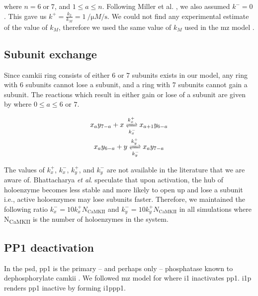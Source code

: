 \documentclass[9pt,lineno,doublespacing]{elife}
\newcommand\SUB[2]{#1\textsubscript{#2}}
\begin{document}
{\noindent where $n=6\;\text{or}\;7$, and $1\le a \le n$. Following Miller et al.
\citep{miller_stability_2005}, we also assumed $k^-=0$. This gave us
$k^+=\frac{k_2}{k_M}=\SI{1}{\per\micro M\per\second}$. We could not find any
experimental estimate of the value of $k_M$, therefore we used the same value of $k_M$ 
used in the \gls{mz} model \citep{miller_stability_2005}.

\subsection{Subunit exchange}\label{subunit exchange} Since \gls{camkii} ring
consists of either 6 or 7 subunits exists in our model, any ring with 6 subunits
cannot lose a subunit, and a ring with 7 subunits cannot gain a subunit. The
reactions which result in either gain or lose of a subunit are given by
 where $0\le a \le 6\text{ or }7$.

\begin{equation}\label{eq:losegainx}
    \begin{gathered}
    x_ay_{7-a} + x \xrightleftharpoons[k^-_x]{k^+_x} x_{a+1}y_{6-a} \\
    x_ay_{6-a} + y \xrightleftharpoons[k^-_y]{k^+_y} x_{a}y_{7-a}
    \end{gathered}
\end{equation}

The values of $k_x^+$, $k_x^-$, $k_y^+$, and $k_y^-$ are not available
in the literature that we are aware of. Bhattacharya \textit{et al}.
\citep{bhattacharyya_molecular_2016} speculate that upon activation, the hub of
holoenzyme becomes less stable and more likely to open up and lose a subunit
i.e., active holoenzymes may lose subunits faster. Therefore, we maintained
the following ratio \(k_x^- = 10 k_x^+ N_{\text{CaMKII}}\) and \(k_y^-
= 10 k_y^+ N_{\text{CaMKII}}\) in all simulations where \SUB{N}{CaMKII}
is the number of holoenzymes in the system.  

\subsection{PP1 deactivation}\label{subsec:pp1_deactivation} 

In the \gls{psd}, \gls{pp1} is the primary -- and perhaps only -- phosphatase
known to dephosphorylate \gls{camkii} \citep{strack_translocation_1997}.  We
followed \gls{mz} model for  where \gls{i1} inactivates \gls{pp1}. 
\Gls{i1p} renders \gls{pp1} inactive by forming \gls{i1ppp1}. 

}
\end{document}
